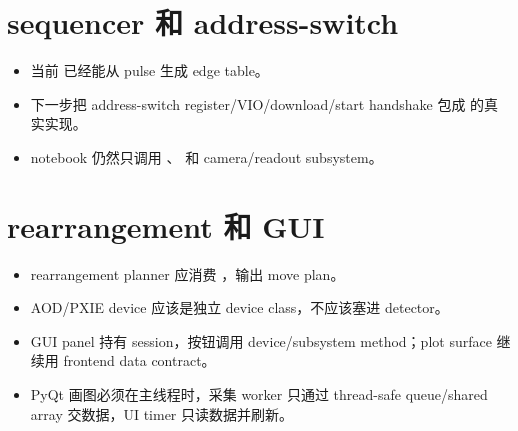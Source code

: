 \documentclass[11pt,oneside,openany]{book}
\begin{document}
\section{sequencer 和 address-switch}
\begin{itemize}
  \item 当前  已经能从 pulse 生成 edge table。
  \item 下一步把 address-switch register/VIO/download/start handshake 包成  的真实实现。
  \item notebook 仍然只调用 、 和 camera/readout subsystem。
\end{itemize}

\section{rearrangement 和 GUI}
\begin{itemize}
  \item rearrangement planner 应消费 ，输出 move plan。
  \item AOD/PXIE device 应该是独立 device class，不应该塞进 detector。
  \item GUI panel 持有 session，按钮调用 device/subsystem method；plot surface 继续用 frontend data contract。
  \item PyQt 画图必须在主线程时，采集 worker 只通过 thread-safe queue/shared array 交数据，UI timer 只读数据并刷新。
\end{itemize}
\end{document}
